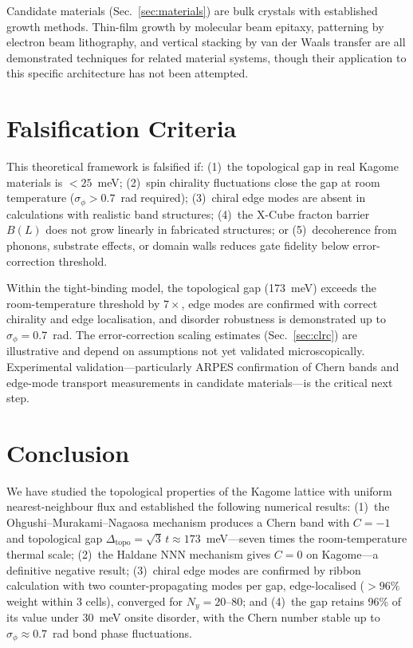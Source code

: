\documentclass[aps,prb,twocolumn,superscriptaddress,floatfix]{revtex4-2}
\begin{document}
Candidate materials (Sec.~\ref{sec:materials}) are bulk crystals with established growth methods. Thin-film growth by molecular beam epitaxy, patterning by electron beam lithography, and vertical stacking by van der Waals transfer are all demonstrated techniques for related material systems, though their application to this specific architecture has not been attempted.

\section{Falsification Criteria}
\label{sec:falsification}

This theoretical framework is falsified if: (1)~the topological gap in real Kagome materials is $< 25$~meV; (2)~spin chirality fluctuations close the gap at room temperature ($\sigma_\phi > 0.7$~rad required); (3)~chiral edge modes are absent in calculations with realistic band structures; (4)~the X-Cube fracton barrier $B(L)$ does not grow linearly in fabricated structures; or (5)~decoherence from phonons, substrate effects, or domain walls reduces gate fidelity below error-correction threshold.

Within the tight-binding model, the topological gap (173~meV) exceeds the room-temperature threshold by $7\times$, edge modes are confirmed with correct chirality and edge localisation, and disorder robustness is demonstrated up to $\sigma_\phi = 0.7$~rad. The error-correction scaling estimates (Sec.~\ref{sec:clrc}) are illustrative and depend on assumptions not yet validated microscopically. Experimental validation---particularly ARPES confirmation of Chern bands and edge-mode transport measurements in candidate materials---is the critical next step.

\section{Conclusion}
\label{sec:conclusion}

We have studied the topological properties of the Kagome lattice with uniform nearest-neighbour flux and established the following numerical results: (1)~the Ohgushi--Murakami--Nagaosa mechanism produces a Chern band with $C = -1$ and topological gap $\Delta_{\mathrm{topo}} = \sqrt{3}\,t \approx 173$~meV---seven times the room-temperature thermal scale; (2)~the Haldane NNN mechanism gives $C = 0$ on Kagome---a definitive negative result; (3)~chiral edge modes are confirmed by ribbon calculation with two counter-propagating modes per gap, edge-localised ($>96\%$ weight within 3 cells), converged for $N_y = 20$--$80$; and (4)~the gap retains 96\% of its value under 30~meV onsite disorder, with the Chern number stable up to $\sigma_\phi \approx 0.7$~rad bond phase fluctuations.
\end{document}
